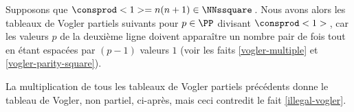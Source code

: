 Supposons que $\consprod<1> = n(n+1) \in \NNssquare$\,. Nous avons alors les tableaux de Vogler partiels suivants pour $p \in \PP$ divisant $\consprod<1>$\,, car les valeurs $p$ de la deuxième ligne doivent apparaître un nombre pair de fois tout en étant espacées par $(p-1)$ valeurs $1$ (voir les faits \ref{vogler-multiple} et \ref{vogler-parity-square}). 

\begin{center}
\end{center}


La multiplication de tous les tableaux de Vogler partiels précédents donne le tableau de Vogler, non partiel, ci-après, mais ceci contredit le fait \ref{illegal-vogler}.

\begin{center}
\end{center}